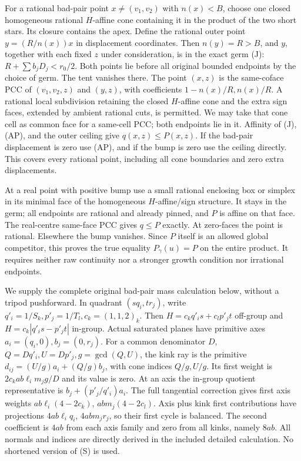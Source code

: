 \documentclass[
  11pt,
]{article}
\begin{document}
For a rational bad-pair point \(x\ne(v_1,v_2)\) with \(n(x)<B\), choose
one closed homogeneous rational \(H\)-affine cone containing it in the
product of the two short stars. Its closure contains the apex. Define
the rational outer point \(y=(R/n(x))x\) in displacement coordinates.
Then \(n(y)=R>B\), and \(y\), together with each fixed \(z\) under
consideration, is in the exact germ (J): \(R+\sum b_jD_j<r_0/2\). Both
points lie before all original bounded endpoints by the choice of germ.
The tent vanishes there. The point \((x,z)\) is the same-coface PCC of
\((v_1,v_2,z)\) and \((y,z)\), with coefficients \(1-n(x)/R,n(x)/R\). A
rational local subdivision retaining the closed \(H\)-affine cone and
the extra sign faces, extended by ambient rational cuts, is permitted.
We may take that cone cell as common face for a same-cell PCC; both
endpoints lie in it. Affinity of (J), (AP), and the outer ceiling give
\(q(x,z)\leq P(x,z)\). If the bad-pair displacement is zero use (AP),
and if the bump is zero use the ceiling directly. This covers every
rational point, including all cone boundaries and zero extra
displacements.

At a real point with positive bump use a small rational enclosing box or
simplex in its minimal face of the homogeneous \(H\)-affine/sign
structure. It stays in the germ; all endpoints are rational and already
pinned, and \(P\) is affine on that face. The real-centre same-face PCC
gives \(q\leq P\) exactly. At zero-faces the point is rational.
Elsewhere the bump vanishes. Since \(P\) itself is an allowed global
competitor, this proves the true equality \(P_\gamma(u)=P\) on the
entire product. It requires neither raw continuity nor a stronger growth
condition nor irrational endpoints.

We supply the complete original bad-pair mass calculation below, without
a tripod pushforward. In quadrant \((sq_i,tr_j)\), write
\(q'_i=1/S_k,p'_j=1/T_l,c_k=(1,1,2)_k\). Then \(H=c_kq'_is+c_lp'_jt\)
off-group and \(H=c_k|q'_is-p'_jt|\) in-group. Actual saturated planes
have primitive axes \(a_i=(q_i,0),b_j=(0,r_j)\). For a common
denominator \(D\), \(Q=Dq'_i,U=Dp'_j,g=\gcd(Q,U)\), the kink ray is the
primitive \(d_{ij}=(U/g)a_i+(Q/g)b_j\), with cone indices \(Q/g,U/g\).
Its first weight is \(2c_kab\ell_i m_jg/D\) and its value is zero. At an
axis the in-group quotient representative is \(b_j+(p'_j/q'_i)a_i\). The
full tangential correction gives first axis weights
\(ab\ell_i(4-2c_k)\), \(ab m_j(4-2c_l)\). Axis plus kink first
contributions have projections \(4ab\ell_iq_i\), \(4ab m_jr_j\), so
their first cycle is balanced. The second coefficient is \(4ab\) from
each axis family and zero from all kinks, namely \(8ab\). All normals
and indices are directly derived in the included detailed calculation.
No shortened version of (S) is used.
\end{document}
